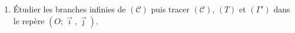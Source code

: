 \begin{exo}
\begin{enumerate}
\begin{enumerate}
                        \item Montrer que $g$ admet une fonction r\'eciproque $g^{-1}$ d\'efinie sur un intervalle
                              $J$ que l'on d\'eterminera.
                              Exprimer $g^{-1} (x)$ en fonction de $x$.
                              On note par $(\Gamma')$ la courbe repr\'esentative de $g^{-1}$.
                  \end{enumerate}
                        \item \'Etudier les branches infinies de $(\mathscr{C})$
                              puis tracer $(\mathscr{C})$, $(T)$ et $(\Gamma')$
                              dans le rep\`ere $(O ; \vec{\imath} , \vec{\jmath})$.
            \end{enumerate}
      \end{exo}

